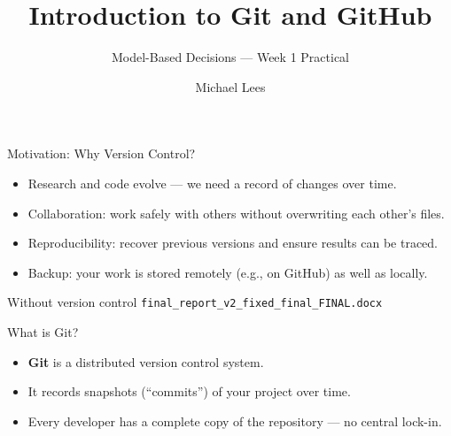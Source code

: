 \documentclass[aspectratio=169,13pt]{beamer}
\title{Introduction to Git and GitHub}
\subtitle{Model-Based Decisions — Week 1 Practical}
\author{Michael Lees}
\institute{Computational Science Lab, University of Amsterdam}
\begin{document}
\begin{frame}
    \titlepage
\end{frame}

\begin{frame}{Motivation: Why Version Control?}
    \begin{itemize}
        \item Research and code evolve — we need a record of changes over time.
        \item Collaboration: work safely with others without overwriting each other's files.
        \item Reproducibility: recover previous versions and ensure results can be traced.
        \item Backup: your work is stored remotely (e.g., on GitHub) as well as locally.
    \end{itemize}
    \pause
    \vspace{1em}
    \begin{block}{Without version control}
        \texttt{final\_report\_v2\_fixed\_final\_FINAL.docx}
    \end{block}
\end{frame}

\begin{frame}{What is Git?}
    \begin{itemize}
        \item \textbf{Git} is a distributed version control system.
        \item It records snapshots (“commits”) of your project over time.
        \item Every developer has a complete copy of the repository — no central lock-in.
    \end{itemize}
    \vspace{1em}
    \begin{center}
    \end{center}
\end{frame}
\end{document}
